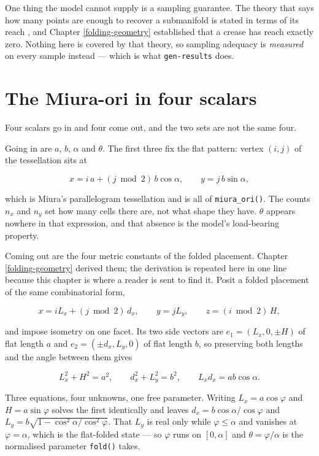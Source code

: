 \documentclass[
  british,
  a4paper,
]{book}
\begin{document}
One thing the model cannot supply is a sampling guarantee. The theory that says
how many points are enough to recover a submanifold is stated in terms of its
reach \citep{niyogi2008homology}, and Chapter \ref{folding-geometry} established
that a crease has reach exactly zero. Nothing here is covered by that theory, so
sampling adequacy is \emph{measured} on every sample instead --- which is what
\texttt{gen-results} does.

\section{The Miura-ori in four scalars}\label{gen-core}

Four scalars go in and four come out, and the two sets are not the same four.

Going in are \(a\), \(b\), \(\alpha\) and \(\theta\). The first three fix the flat
pattern: vertex \((i, j)\) of the tessellation sits at

\[x = i\,a + (j \bmod 2)\, b \cos\alpha, \qquad y = j\, b \sin\alpha,\]

which is Miura's parallelogram tessellation \citep{miura1985method} and is all of
\texttt{miura\_ori()}. The counts \(n_x\) and \(n_y\) set how many cells there are, not what
shape they have. \(\theta\) appears nowhere in that expression, and that absence is
the model's load-bearing property.

Coming out are the four metric constants of the folded placement. Chapter
\ref{folding-geometry} derived them; the derivation is repeated here in one
line because this chapter is where a reader is sent to find it. Posit a folded
placement of the same combinatorial form,

\[x = i L_x + (j \bmod 2)\, d_x, \qquad y = j L_y, \qquad z = (i \bmod 2)\, H,\]

and impose isometry on one facet. Its two side vectors are
\(e_1 = (L_x, 0, \pm H)\) of flat length \(a\) and \(e_2 = (\pm d_x, L_y, 0)\) of flat
length \(b\), so preserving both lengths and the angle between them gives

\[L_x^2 + H^2 = a^2, \qquad d_x^2 + L_y^2 = b^2, \qquad L_x d_x = ab\cos\alpha .\]

Three equations, four unknowns, one free parameter. Writing \(L_x = a\cos\varphi\)
and \(H = a\sin\varphi\) solves the first identically and leaves
\(d_x = b\cos\alpha/\cos\varphi\) and
\(L_y = b\sqrt{1 - \cos^2\alpha/\cos^2\varphi}\). That \(L_y\) is real only while
\(\varphi \le \alpha\) and vanishes at \(\varphi = \alpha\), which is the
flat-folded state --- so \(\varphi\) runs on \([0, \alpha]\) and \(\theta = \varphi/\alpha\)
is the normalised parameter \texttt{fold()} takes.
\end{document}
